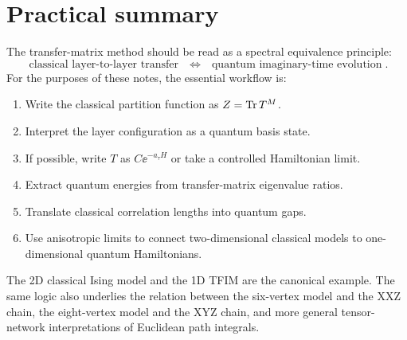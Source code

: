 \section{Practical summary}
\label{sec:transfer-practical-summary}

The transfer-matrix method should be read as a spectral equivalence principle:
\begin{equation}
\label{eq:transfer-spectral-equivalence-principle}
    \boxed{
    \text{classical layer-to-layer transfer}
    \quad\Longleftrightarrow\quad
    \text{quantum imaginary-time evolution}
    }.
\end{equation}
For the purposes of these notes, the essential workflow is:
\begin{enumerate}[label=(\roman*)]
    \item Write the classical partition function as $Z=\operatorname{Tr} T^M$.
    \item Interpret the layer configuration as a quantum basis state.
    \item If possible, write $T$ as $C\ee^{-a_\tau H}$ or take a controlled
    Hamiltonian limit.
    \item Extract quantum energies from transfer-matrix eigenvalue ratios.
    \item Translate classical correlation lengths into quantum gaps.
    \item Use anisotropic limits to connect two-dimensional classical models to
    one-dimensional quantum Hamiltonians.
\end{enumerate}
The 2D classical Ising model and the 1D TFIM are the canonical example. The same
logic also underlies the relation between the six-vertex model and the XXZ chain,
the eight-vertex model and the XYZ chain, and more general tensor-network
interpretations of Euclidean path integrals.
